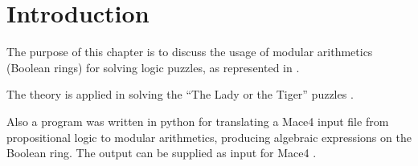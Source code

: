 \section{Introduction}

The purpose of this chapter is to discuss the usage of modular arithmetics (Boolean rings) for solving logic puzzles, as represented in \cite{Ciraulo2020algebra}.  

The theory is applied in solving the ``The Lady or the Tiger'' puzzles \cite{Smullyan1992}.

Also a program was written in python for translating a Mace4 input file from propositional logic to modular arithmetics, producing algebraic expressions on the Boolean ring. The output can be supplied as input for Mace4 \cite{Mace4Manual}.

